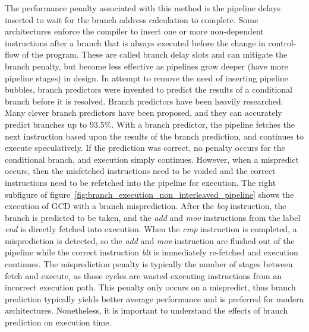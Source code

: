 The performance penalty associated with this method is the pipeline delays inserted to wait for the branch address calculation to complete. 
Some architectures enforce the compiler to insert one or more non-dependent instructions after a branch that is always executed before the change in control-flow of the program. 
These are called branch delay slots and can mitigate the branch penalty, but become less effective as pipelines grow deeper (have more pipeline stages) in design. 
In attempt to remove the need of inserting pipeline bubbles, branch predictors were invented to predict the results of a conditional branch before it is resolved.
Branch predictors have been heavily researched.
Many clever branch predictors have been proposed, and they can accurately predict branches up to 93.5\%.
With a branch predictor, the pipeline fetches the next instruction based upon the results of the branch prediction, and continues to execute speculatively. 
If the prediction was correct, no penalty occurs for the conditional branch, and execution simply continues. 
However, when a mispredict occurs, then the misfetched instructions need to be voided and the correct instructions need to be refetched into the pipeline for execution.
The right subfigure of figure~\ref{fig:branch_execution_non_interleaved_pipeline} shows the execution of GCD with a branch misprediction.
After the \emph{beq} instruction, the branch is predicted to be taken, and the \emph{add} and \emph{mov} instructions from the label \emph{end} is directly fetched into execution. 
When the \emph{cmp} instruction is completed, a misprediction is detected, so the \emph{add} and \emph{mov} instruction are flushed out of the pipeline while the correct instruction \emph{blt} is immediately re-fetched and execution continues.
The misprediction penalty is typically the number of stages between fetch and execute, as those cycles are wasted executing instructions from an incorrect execution path.
This penalty only occurs on a mispredict, thus branch prediction typically yields better average performance and is preferred for modern architectures.
Nonetheless, it is important to understand the effects of branch prediction on execution time. 

